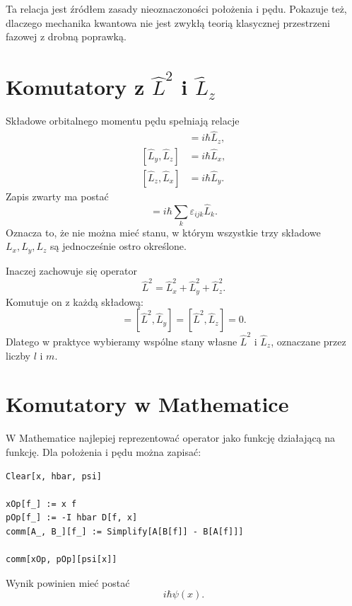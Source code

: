 Ta relacja jest źródłem zasady nieoznaczoności położenia i pędu. Pokazuje też, dlaczego mechanika kwantowa nie jest zwykłą teorią klasycznej przestrzeni fazowej z drobną poprawką.

\section[Komutatory z L2 i Lz]{Komutatory z \texorpdfstring{\(\hat{L}^2\)}{L2} i \texorpdfstring{\(\hat{L}_z\)}{Lz}}

Składowe orbitalnego momentu pędu spełniają relacje
\begin{align}
    [\hat{L}_x,\hat{L}_y]&=i\hbar\hat{L}_z,\\
    [\hat{L}_y,\hat{L}_z]&=i\hbar\hat{L}_x,\\
    [\hat{L}_z,\hat{L}_x]&=i\hbar\hat{L}_y.
\end{align}
Zapis zwarty ma postać
\begin{equation}
    [\hat{L}_i,\hat{L}_j]
    =i\hbar\sum_k\varepsilon_{ijk}\hat{L}_k.
\end{equation}
Oznacza to, że nie można mieć stanu, w którym wszystkie trzy składowe \(L_x,L_y,L_z\) są jednocześnie ostro określone.

Inaczej zachowuje się operator
\begin{equation}
    \hat{L}^2=\hat{L}_x^2+\hat{L}_y^2+\hat{L}_z^2.
\end{equation}
Komutuje on z każdą składową:
\begin{equation}
    [\hat{L}^2,\hat{L}_x]=[\hat{L}^2,\hat{L}_y]=[\hat{L}^2,\hat{L}_z]=0.
\end{equation}
Dlatego w praktyce wybieramy wspólne stany własne \(\hat{L}^2\) i \(\hat{L}_z\), oznaczane przez liczby \(l\) i \(m\).

\section{Komutatory w Mathematice}

W Mathematice najlepiej reprezentować operator jako funkcję działającą na funkcję. Dla położenia i pędu można zapisać:
\begin{verbatim}
Clear[x, hbar, psi]

xOp[f_] := x f
pOp[f_] := -I hbar D[f, x]
comm[A_, B_][f_] := Simplify[A[B[f]] - B[A[f]]]

comm[xOp, pOp][psi[x]]
\end{verbatim}
Wynik powinien mieć postać
\begin{equation}
    i\hbar\psi(x).
\end{equation}

